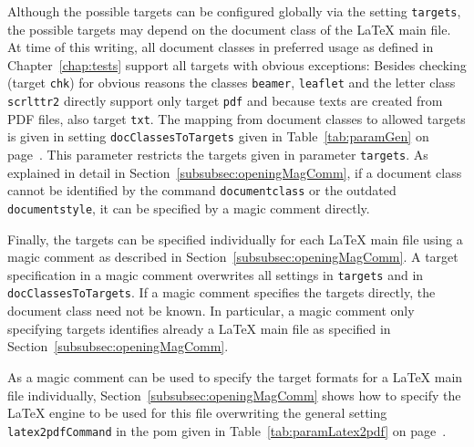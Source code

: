 Although the possible targets can be configured globally 
via the setting \texttt{targets}, 
the possible targets may depend on the document class of the \LaTeX{} main file. 
At time of this writing, 
all document classes in preferred usage as defined in Chapter~\ref{chap:tests} 
support all targets with obvious exceptions: 
Besides checking (target \texttt{chk}) for obvious reasons 
the classes \texttt{beamer}, \texttt{leaflet} and the letter class \texttt{scrlttr2} 
directly support only target \texttt{pdf} 
and because texts are created from PDF files, also target \texttt{txt}. 
The mapping from document classes to allowed targets 
is given in setting \texttt{docClassesToTargets} given in 
Table~\ref{tab:paramGen} on page~\pageref{tab:paramGen}. 
This parameter restricts the targets given in parameter \texttt{targets}. 
As explained in detail in Section~\ref{subsubsec:openingMagComm}, 
if a document class cannot be identified by the command \texttt{documentclass} 
or the outdated \texttt{documentstyle}, 
it can be specified by a magic comment directly. 

Finally, the targets can be specified individually for each \LaTeX{} main file 
using a magic comment as described in Section~\ref{subsubsec:openingMagComm}. 
A target specification in a magic comment overwrites all settings in 
\texttt{targets} and in \texttt{docClassesToTargets}. 
If a magic comment specifies the targets directly, 
the document class need not be known. 
In particular, a magic comment only specifying targets identifies already a \LaTeX{} main file 
as specified in Section~\ref{subsubsec:openingMagComm}. 

As a magic comment can be used 
to specify the target formats for a \LaTeX{} main file individually, 
Section~\ref{subsubsec:openingMagComm} shows 
how to specify the \LaTeX{} engine to be used for this file 
overwriting the general setting \texttt{latex2pdfCommand} in the pom 
given in Table~\ref{tab:paramLatex2pdf} on page~\pageref{tab:paramLatex2pdf}. 




